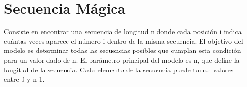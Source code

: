 
\section{Secuencia Mágica}\label{sec:03-secuencia-magica}
Consiste en encontrar una secuencia de longitud n donde cada posición i indica cuántas veces aparece el número i dentro de la misma secuencia.
El objetivo del modelo es determinar todas las secuencias posibles que cumplan esta condición para un valor dado de n.
El parámetro principal del modelo es n, que define la longitud de la secuencia. Cada elemento de la secuencia puede tomar valores entre 0 y n-1.

